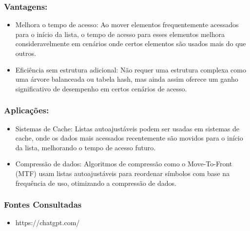 \documentclass{article}
\begin{document}
\subsubsection{Vantagens:}
\begin{itemize}
    \item Melhora o tempo de acesso: Ao mover elementos frequentemente acessados para o início da lista, o tempo de acesso para esses elementos melhora consideravelmente em cenários onde certos elementos são usados mais do que outros.
    \item Eficiência sem estrutura adicional: Não requer uma estrutura complexa como uma árvore balanceada ou tabela hash, mas ainda assim oferece um ganho significativo de desempenho em certos cenários de acesso.
\end{itemize}

\subsubsection{Aplicações:}
\begin{itemize}
    \item Sistemas de Cache: Listas autoajustáveis podem ser usadas em sistemas de cache, onde os dados mais acessados recentemente são movidos para o início da lista, melhorando o tempo de acesso futuro.

    \item Compressão de dados: Algoritmos de compressão como o Move-To-Front (MTF) usam listas autoajustáveis para reordenar símbolos com base na frequência de uso, otimizando a compressão de dados.
\end{itemize}

\subsubsection{Fontes Consultadas}
\begin{itemize}
    \item https://chatgpt.com/
\end{itemize}
\end{document}

